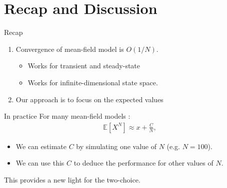 \documentclass{beamer}
\newcommand\esp[1]{\mathbb{E}\left[#1\right]}
\begin{document}
\section{Recap and Discussion}

\begin{frame}{Recap}
  
  \begin{enumerate}
  \item Convergence of mean-field model is $O(1/N)$. 
    \begin{itemize}
    \item Works for transient and steady-state 
    \item Works for infinite-dimensional state space. 
    \end{itemize}\bigskip
    
  \item Our approach is to focus on the expected values
    \begin{center}
      \hspace{-1cm}
    \end{center}
  \end{enumerate}
\end{frame}

\begin{frame}{In practice}
  For many mean-field models : 
  \begin{align*}
    \esp{X^N} \approx x + \frac{C}{N},
  \end{align*}
  \begin{itemize}
  \item We can estimate $C$
    by simulating one value of $N$ (e.g. $N=100$).
  \item We can use this $C$ to deduce the performance for other values of
    $N$.  
  \end{itemize}
  \bigskip
  
  This provides a new light for the two-choice. 
\end{frame}
\end{document}
